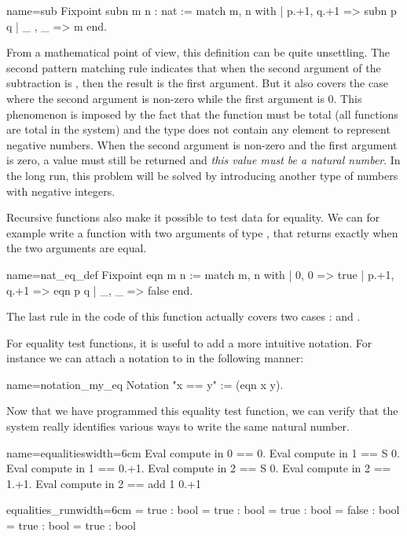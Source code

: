 \begin{coq}{name=sub}{}
Fixpoint subn m n : nat :=
  match m, n with
  | p.+1, q.+1 => subn p q
  | _ , _ => m
  end.
\end{coq}
From a mathematical point of view, this definition can be quite
unsettling.  The second pattern matching rule indicates that when
the second argument of the subtraction is , then the result is
the first argument.  But it also covers the case where the second
argument is non-zero while the first argument is 0.  This phenomenon
is imposed by the fact that the function must be total (all functions
are total in the \Coq{} system) and the type  does not contain any
element to represent negative numbers.  When the second argument is non-zero
and the first argument is zero, a value must still be returned and
{\em this value must be a natural number}.  In the long run, this
problem will be solved by introducing another type of numbers with
negative integers.

Recursive functions also make it possible to test data for
equality. We can for example write a function with two arguments of
type , that
returns  exactly when the two arguments are equal.

\begin{coq}{name=nat_eq_def}{}
Fixpoint eqn m n :=
  match m, n with
  | 0, 0 => true
  | p.+1, q.+1 => eqn p q
  | _, _ => false
  end.
\end{coq}
The last rule in the code of this function actually covers two cases :
 and .

For equality test functions, it is useful to add a more intuitive
notation.  For instance we can attach a notation to  in
the following manner:

\begin{coq}{name=notation_my_eq}{}
Notation "x == y" := (eqn x y).
\end{coq}
Now
that we have programmed this equality test function, we can verify
that the \Coq{} system really identifies various ways to write the same
natural number.

\begin{coq}{name=equalities}{width=6cm}
Eval compute in 0 == 0.
Eval compute in 1 == S 0.
Eval compute in 1 == 0.+1.
Eval compute in 2 == S 0.
Eval compute in 2 == 1.+1.
Eval compute in 2 == add 1 0.+1
\end{coq}
\begin{coqout}{equalities_run}{width=6cm}
= true : bool
= true : bool
= true : bool
= false : bool
= true : bool
= true : bool
\end{coqout}

